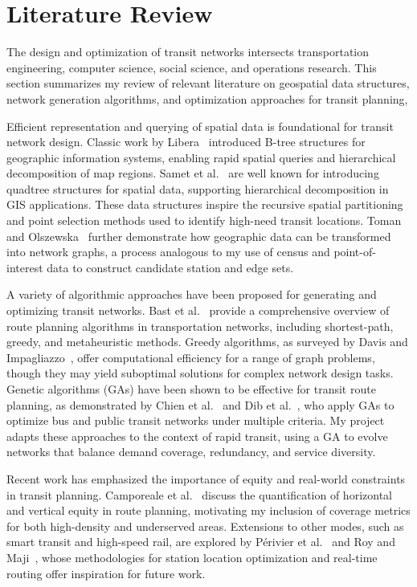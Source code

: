 \documentclass[sigconf,nonacm]{acmart}
\begin{document}
\section{Literature Review}

The design and optimization of transit networks intersects transportation engineering, computer science, social science, and operations research. This section summarizes my review of relevant literature on geospatial data structures, network generation algorithms, and optimization approaches for transit planning,

Efficient representation and querying of spatial data is foundational for transit network design. Classic work by Libera~\cite{bib:libera1986btrees} introduced B-tree structures for geographic information systems, enabling rapid spatial queries and hierarchical decomposition of map regions. Samet et al.~\cite{bib:samet1984quadtrees} are well known for introducing quadtree structures for spatial data, supporting hierarchical decomposition in GIS applications. These data structures inspire the recursive spatial partitioning and point selection methods used to identify high-need transit locations. Toman and Olszewska~\cite{toman2014algorithm} further demonstrate how geographic data can be transformed into network graphs, a process analogous to my use of census and point-of-interest data to construct candidate station and edge sets.

A variety of algorithmic approaches have been proposed for generating and optimizing transit networks. Bast et al.~\cite{bast2016route} provide a comprehensive overview of route planning algorithms in transportation networks, including shortest-path, greedy, and metaheuristic methods. Greedy algorithms, as surveyed by Davis and Impagliazzo~\cite{davis2007greedy}, offer computational efficiency for a range of graph problems, though they may yield suboptimal solutions for complex network design tasks. Genetic algorithms (GAs) have been shown to be effective for transit route planning, as demonstrated by Chien et al.~\cite{chien2001genetic} and Dib et al.~\cite{bib:dib2017ga}, who apply GAs to optimize bus and public transit networks under multiple criteria. My project adapts these approaches to the context of rapid transit, using a GA to evolve networks that balance demand coverage, redundancy, and service diversity.

Recent work has emphasized the importance of equity and real-world constraints in transit planning. Camporeale et al.~\cite{camporeale2016equity} discuss the quantification of horizontal and vertical equity in route planning, motivating my inclusion of coverage metrics for both high-density and underserved areas. Extensions to other modes, such as smart transit and high-speed rail, are explored by P\'erivier et al.~\cite{perivier2021realtime} and Roy and Maji~\cite{roy2023hsr}, whose methodologies for station location optimization and real-time routing offer inspiration for future work.
\end{document}
